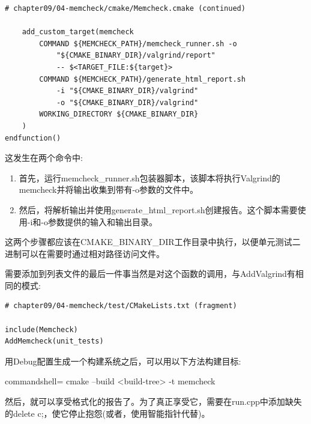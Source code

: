 \begin{lstlisting}[style=styleCMake]
# chapter09/04-memcheck/cmake/Memcheck.cmake (continued)

	add_custom_target(memcheck
		COMMAND ${MEMCHECK_PATH}/memcheck_runner.sh -o
			"${CMAKE_BINARY_DIR}/valgrind/report"
			-- $<TARGET_FILE:${target}>
		COMMAND ${MEMCHECK_PATH}/generate_html_report.sh
			-i "${CMAKE_BINARY_DIR}/valgrind"
			-o "${CMAKE_BINARY_DIR}/valgrind"
		WORKING_DIRECTORY ${CMAKE_BINARY_DIR}
	)
endfunction()
\end{lstlisting}

这发生在两个命令中:

\begin{enumerate}
\item 
首先，运行memcheck\_runner.sh包装器脚本，该脚本将执行Valgrind的memcheck并将输出收集到带有-o参数的文件中。

\item 
然后，将解析输出并使用generate\_html\_report.sh创建报告。这个脚本需要使用-i和-o参数提供的输入和输出目录。
\end{enumerate}

这两个步骤都应该在CMAKE\_BINARY\_DIR工作目录中执行，以便单元测试二进制可以在需要时通过相对路径访问文件。

需要添加到列表文件的最后一件事当然是对这个函数的调用，与AddValgrind有相同的模式:

\begin{lstlisting}[style=styleCMake]
# chapter09/04-memcheck/test/CMakeLists.txt (fragment)

include(Memcheck)
AddMemcheck(unit_tests)
\end{lstlisting}

用Debug配置生成一个构建系统之后，可以用以下方法构建目标:

\begin{tcblisting}{commandshell={}}
cmake --build <build-tree> -t memcheck
\end{tcblisting}

然后，就可以享受格式化的报告了。为了真正享受它，需要在run.cpp中添加缺失的delete c;，使它停止抱怨(或者，使用智能指针代替)。









